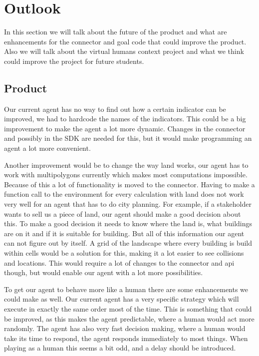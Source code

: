 \chapter{Outlook}
In this section we will talk about the future of the product and what are enhancements for the connector and goal code that could improve the product. Also we will talk about the virtual humans context project and what we think could improve the project for future students.

\section {Product}
Our current agent has no way to find out how a certain indicator can be improved, we had to hardcode the names of the indicators. This could be a big improvement to make the agent a lot more dynamic. Changes in the connector and possibly in the SDK are needed for this, but it would make programming an agent a lot more convenient.

Another improvement would be to change the way land works, our agent has to work with multipolygons currently which makes most computations impossible. Because of this a lot of functionality is moved to the connector. Having to make a function call to the environment for every calculation with land does not work very well for an agent that has to do city planning. For example, if a stakeholder wants to sell us a piece of land, our agent should make a good decision about this. To make a good decision it needs to know where the land is, what buildings are on it and if it is suitable for building. But all of this information our agent can not figure out by itself. A grid of the landscape where every building is build within cells would be a solution for this, making it a lot easier to see collisions and locations. This would require a lot of changes to the connector and api though, but would enable our agent with a lot more possibilities.

To get our agent to behave more like a human there are some enhancements we could make as well. Our current agent has a very specific strategy which will execute in exactly the same order most of the time. This is something that could be improved, as this makes the agent predictable, where a human would act more randomly. The agent has also very fast decision making, where a human would take its time to respond, the agent responds immediately to most things. When playing as a human this seems a bit odd, and a delay should be introduced.